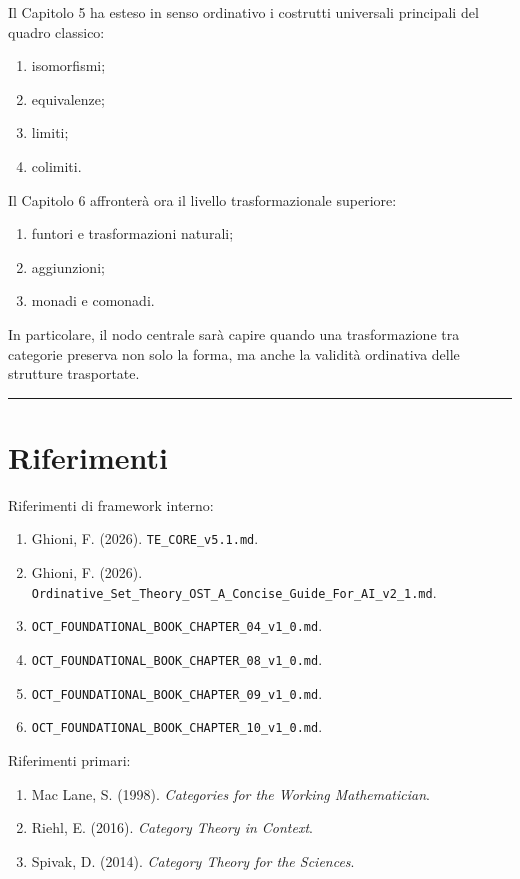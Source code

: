Il Capitolo 5 ha esteso in senso ordinativo i costrutti universali principali del quadro classico:

\begin{enumerate}
\def\labelenumi{\arabic{enumi}.}
\tightlist
\item
  isomorfismi;
\item
  equivalenze;
\item
  limiti;
\item
  colimiti.
\end{enumerate}

Il Capitolo 6 affronterà ora il livello trasformazionale superiore:

\begin{enumerate}
\def\labelenumi{\arabic{enumi}.}
\tightlist
\item
  funtori e trasformazioni naturali;
\item
  aggiunzioni;
\item
  monadi e comonadi.
\end{enumerate}

In particolare, il nodo centrale sarà capire quando una trasformazione tra categorie preserva non solo la forma, ma anche la validità ordinativa delle strutture trasportate.

\begin{center}\rule{0.5\linewidth}{0.5pt}\end{center}

\section{Riferimenti}

Riferimenti di framework interno:

\begin{enumerate}
\def\labelenumi{\arabic{enumi}.}
\tightlist
\item
  Ghioni, F. (2026). \texttt{TE\_CORE\_v5.1.md}.
\item
  Ghioni, F. (2026). \texttt{Ordinative\_Set\_Theory\_OST\_A\_Concise\_Guide\_For\_AI\_v2\_1.md}.
\item
  \texttt{OCT\_FOUNDATIONAL\_BOOK\_CHAPTER\_04\_v1\_0.md}.
\item
  \texttt{OCT\_FOUNDATIONAL\_BOOK\_CHAPTER\_08\_v1\_0.md}.
\item
  \texttt{OCT\_FOUNDATIONAL\_BOOK\_CHAPTER\_09\_v1\_0.md}.
\item
  \texttt{OCT\_FOUNDATIONAL\_BOOK\_CHAPTER\_10\_v1\_0.md}.
\end{enumerate}

Riferimenti primari:

\begin{enumerate}
\def\labelenumi{\arabic{enumi}.}
\tightlist
\item
  Mac Lane, S. (1998). \emph{Categories for the Working Mathematician}.
\item
  Riehl, E. (2016). \emph{Category Theory in Context}.
\item
  Spivak, D. (2014). \emph{Category Theory for the Sciences}.
\end{enumerate}
